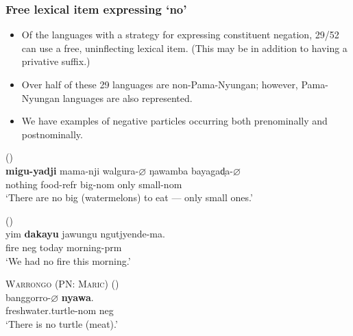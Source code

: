 \documentclass{article}
\begin{document}
\subsubsection{Free lexical item expressing `no'}

\begin{itemize}
\item Of the languages with a strategy for expressing constituent negation, 29/52 can use a free, uninflecting lexical item. (This may be in addition to having a privative suffix.)
\item Over half of these 29 languages are non-Pama-Nyungan; however, Pama-Nyungan languages are also represented.
\item We have examples of negative particles occurring both prenominally and postnominally.
\end{itemize}

\begin{exe}
   (\citealt[37]{furby77}) \\
  \gll \textbf{migu-yadji}    mama-nji    walgura-$\varnothing$    ŋawamba    bayagad̩a-$\varnothing$ \\
  nothing    food-{\sc refr}    big-{\sc nom}    only        small-{\sc nom} \\
  \glt `There are no big (watermelons) to eat --- only small ones.'

   (\citealt[102]{zandvoort99})\\
  \gll yim \textbf{dakayu} jawungu ngutjyende-ma.\\
  fire {\sc neg} today morning-{\sc prm}\\
  \glt `We had no fire this morning.' %
  
  \ex \textsc{Warrongo (PN: Maric)} (\citealt[660]{tsunoda11})\\
  \gll banggorro-$\varnothing$ \textbf{nyawa}.\\
  freshwater.turtle-{\sc nom} {\sc neg}\\
  \glt `There is no turtle (meat).' 
\end{exe}
\end{document}
